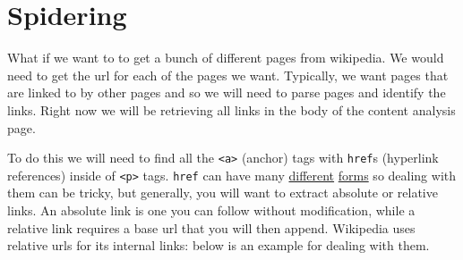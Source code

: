 \documentclass[11pt]{article}
\begin{document}
    \section{Spidering}\label{spidering}

What if we want to to get a bunch of different pages from wikipedia. We
would need to get the url for each of the pages we want. Typically, we
want pages that are linked to by other pages and so we will need to
parse pages and identify the links. Right now we will be retrieving all
links in the body of the content analysis page.

To do this we will need to find all the
\texttt{\textless{}a\textgreater{}} (anchor) tags with \texttt{href}s
(hyperlink references) inside of \texttt{\textless{}p\textgreater{}}
tags. \texttt{href} can have many
\href{http://stackoverflow.com/questions/4855168/what-is-href-and-why-is-\%20it-used}{different}
\href{https://en.wikipedia.org/wiki/Hyperlink\#Hyperlinks_in_HTML}{forms}
so dealing with them can be tricky, but generally, you will want to
extract absolute or relative links. An absolute link is one you can
follow without modification, while a relative link requires a base url
that you will then append. Wikipedia uses relative urls for its internal
links: below is an example for dealing with them.
\end{document}
